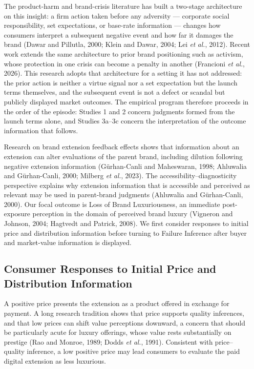 \documentclass[12pt, a4paper]{article}
\begin{document}
The product-harm and brand-crisis literature has built a two-stage architecture on this insight: a firm action taken before any adversity --- corporate social responsibility, set expectations, or base-rate information --- changes how consumers interpret a subsequent negative event and how far it damages the brand (Dawar and Pillutla, 2000; Klein and Dawar, 2004; Lei \emph{et al.}, 2012). Recent work extends the same architecture to prior brand positioning such as activism, whose protection in one crisis can become a penalty in another (Francioni \emph{et al.}, 2026). This research adopts that architecture for a setting it has not addressed: the prior action is neither a virtue signal nor a set expectation but the launch terms themselves, and the subsequent event is not a defect or scandal but publicly displayed market outcomes. The empirical program therefore proceeds in the order of the episode: Studies 1 and 2 concern judgments formed from the launch terms alone, and Studies 3a--3c concern the interpretation of the outcome information that follows.

Research on brand extension feedback effects shows that information about an extension can alter evaluations of the parent brand, including dilution following negative extension information (G\"urhan-Canli and Maheswaran, 1998; Ahluwalia and G\"urhan-Canli, 2000; Milberg \emph{et al.}, 2023). The accessibility--diagnosticity perspective explains why extension information that is accessible and perceived as relevant may be used in parent-brand judgments (Ahluwalia and G\"urhan-Canli, 2000). Our focal outcome is Loss of Brand Luxuriousness, an immediate post-exposure perception in the domain of perceived brand luxury (Vigneron and Johnson, 2004; Hagtvedt and Patrick, 2008). We first consider responses to initial price and distribution information before turning to Failure Inference after buyer and market-value information is displayed.

\subsection{Consumer Responses to Initial Price and Distribution Information}

A positive price presents the extension as a product offered in exchange for payment. A long research tradition shows that price supports quality inferences, and that low prices can shift value perceptions downward, a concern that should be particularly acute for luxury offerings, whose value rests substantially on prestige (Rao and Monroe, 1989; Dodds \emph{et al.}, 1991). Consistent with price--quality inference, a low positive price may lead consumers to evaluate the paid digital extension as less luxurious.
\end{document}

